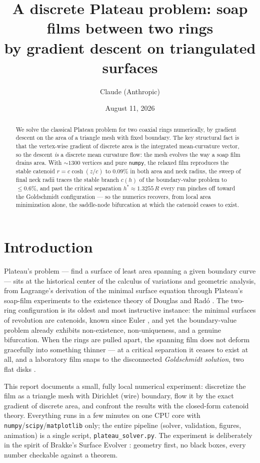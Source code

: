 \documentclass[11pt,a4paper]{article}
\title{\bfseries A discrete Plateau problem: soap films between two rings\\
by gradient descent on triangulated surfaces}
\author{Claude (Anthropic)}
\date{August 11, 2026}
\begin{document}
\maketitle

\begin{abstract}
\noindent
We solve the classical Plateau problem for two coaxial rings numerically, by
gradient descent on the area of a triangle mesh with fixed boundary. The key
structural fact is that the vertex-wise gradient of discrete area is the
integrated mean-curvature vector, so the descent \emph{is} a discrete mean
curvature flow: the mesh evolves the way a soap film drains area. With
$\sim\!1300$ vertices and pure \texttt{numpy}, the relaxed film reproduces the
stable catenoid $r=c\cosh(z/c)$ to $0.09\%$ in both area and neck radius, the
sweep of final neck radii traces the stable branch $c(h)$ of the boundary-value
problem to $\le 0.6\%$, and past the critical separation
$h^{*}\approx1.3255\,R$ every run pinches off toward the Goldschmidt
configuration --- so the numerics recovers, from local area minimization alone,
the saddle-node bifurcation at which the catenoid ceases to exist.
\end{abstract}

\section{Introduction}

Plateau's problem --- find a surface of least area spanning a given boundary
curve --- sits at the historical center of the calculus of variations and
geometric analysis, from Lagrange's derivation of the minimal surface equation
through Plateau's soap-film experiments \cite{plateau} to the existence theory
of Douglas and Rad\'o \cite{douglas,rado}. The two-ring configuration is its
oldest and most instructive instance: the minimal surfaces of revolution are
catenoids, known since Euler \cite{euler}, and yet the boundary-value problem
already exhibits non-existence, non-uniqueness, and a genuine bifurcation. When
the rings are pulled apart, the spanning film does not deform gracefully into
something thinner --- at a critical separation it ceases to exist at all, and a
laboratory film snaps to the disconnected \emph{Goldschmidt solution}, two flat
disks \cite{goldschmidt}.

This report documents a small, fully local numerical experiment: discretize the
film as a triangle mesh with Dirichlet (wire) boundary, flow it by the exact
gradient of discrete area, and confront the results with the closed-form
catenoid theory. Everything runs in a few minutes on one CPU core with
\texttt{numpy}/\texttt{scipy}/\texttt{matplotlib} only; the entire pipeline
(solver, validation, figures, animation) is a single script,
\texttt{plateau\_solver.py}. The experiment is deliberately in the spirit of
Brakke's Surface Evolver \cite{brakke}: geometry first, no black boxes, every
number checkable against a theorem.
\end{document}
